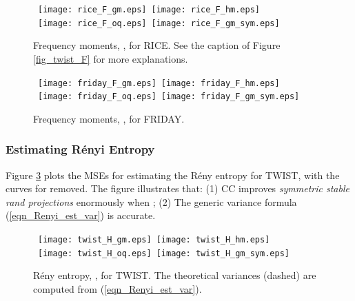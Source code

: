 \documentclass{sig-alternate}
\begin{document}
\begin{figure}[h]
\begin{center}\mbox{
{\texttt{[image: rice\_F\_gm.eps]}} \hspace{-0.1in}
{\texttt{[image: rice\_F\_hm.eps]}}}\\\mbox{
{\texttt{[image: rice\_F\_oq.eps]}} \hspace{-0.1in}
{\texttt{[image: rice\_F\_gm\_sym.eps]}}}
\end{center}
\vspace{-0.15in}
\caption{ Frequency moments, , for RICE. See the caption of Figure \ref{fig_twist_F} for more explanations.}\label{fig_rice_F}
\end{figure}
\vspace{-0.2in}
\begin{figure}[h]
\begin{center}\mbox{
{\texttt{[image: friday\_F\_gm.eps]}} \hspace{-0.1in}
{\texttt{[image: friday\_F\_hm.eps]}}}\\\mbox{
{\texttt{[image: friday\_F\_oq.eps]}} \hspace{-0.1in}
{\texttt{[image: friday\_F\_gm\_sym.eps]}}\vspace{-0.1in}
}
\end{center}
\vspace{-0.15in}
\caption{ Frequency moments, , for FRIDAY. }\label{fig_friday_F}
\end{figure}


\vspace{0.2in}
\subsubsection{Estimating R\'enyi Entropy}

Figure \ref{fig_twist_H} plots the MSEs for estimating the R\'eny entropy for TWIST,  with the curves for  removed.
The figure illustrates that: (1) CC improves {\em symmetric stable rand projections} enormously when ; (2) The generic variance formula (\ref{eqn_Renyi_est_var}) is accurate.

\begin{figure}[h]
\begin{center}\mbox{
{\texttt{[image: twist\_H\_gm.eps]}} \hspace{-0.1in}
{\texttt{[image: twist\_H\_hm.eps]}}}\\\mbox{
{\texttt{[image: twist\_H\_oq.eps]}} \hspace{-0.1in}
{\texttt{[image: twist\_H\_gm\_sym.eps]}}
}
\end{center}
\vspace{-0.15in}
\caption{R\'eny entropy, , for TWIST. The theoretical variances (dashed) are computed from (\ref{eqn_Renyi_est_var}).  }\label{fig_twist_H}
\end{figure}
\end{document}
